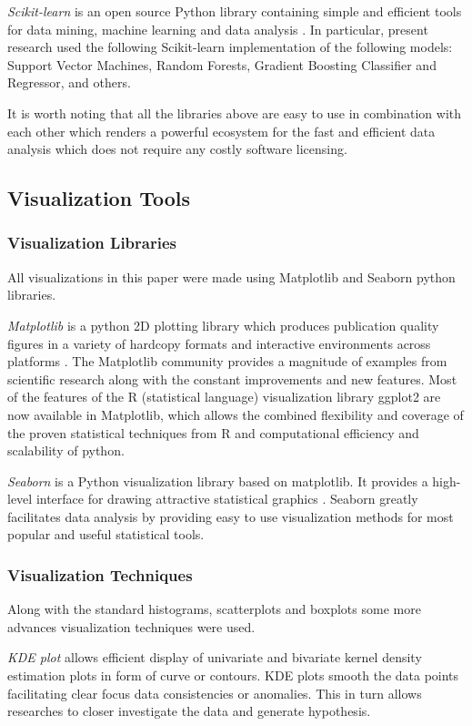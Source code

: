 	\textit{Scikit-learn} is an open source Python library containing simple and efficient tools for data mining, machine learning and data analysis . In particular, present research used the following Scikit-learn implementation of the following models: Support Vector Machines, Random Forests, Gradient Boosting Classifier and Regressor, and others. 
	
	It is worth noting that all the libraries above are easy to use in combination with each other which renders a powerful ecosystem for the fast and efficient data analysis which does not require any costly software licensing. 
	
	\subsection{Visualization Tools}
	\subsubsection{Visualization Libraries}
	All visualizations in this paper were made using Matplotlib and Seaborn python libraries. 
	
	\textit{Matplotlib} is a python 2D plotting library which produces publication quality figures in a variety of hardcopy formats and interactive environments across platforms . The Matplotlib community provides a magnitude of examples from scientific research along with the constant improvements and new features. Most of the features of the R (statistical language) visualization library ggplot2 are now available in Matplotlib, which allows the combined flexibility and coverage of the proven statistical techniques from R and computational efficiency and scalability of python.  
	
	\textit{Seaborn} is a Python visualization library based on matplotlib. It provides a high-level interface for drawing attractive statistical graphics . Seaborn greatly facilitates data analysis by providing easy to use visualization methods for most popular and useful statistical tools. 
	
	\subsubsection{Visualization Techniques}
	Along with the standard histograms, scatterplots and boxplots some more advances visualization techniques were used.
	
	\textit{KDE plot} allows efficient display of univariate and bivariate kernel density estimation plots in form of curve or contours. KDE plots smooth the data points facilitating clear focus data consistencies or anomalies. This in turn allows researches to closer investigate the data and generate hypothesis.
	
